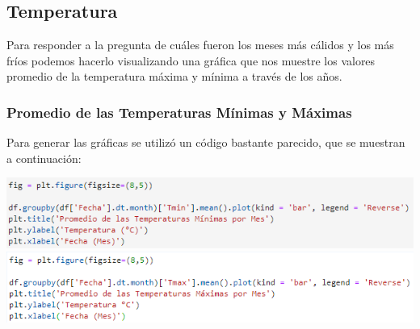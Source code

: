 \documentclass{article}
\begin{document}
\subsection{Temperatura}
Para responder a la pregunta de cuáles fueron los meses más cálidos y los más fríos podemos hacerlo visualizando una gráfica que nos muestre los valores promedio de la temperatura máxima y mínima a través de los años.

\subsubsection{Promedio de las Temperaturas Mínimas y Máximas}
Para generar las gráficas se utilizó un código bastante parecido, que se muestran a continuación:
\begin{center}
    \includegraphics[scale = 0.6]{Tmin.png}
    \includegraphics[scale = 0.6]{Tmax.png}
\end{center}

\clearpage
\end{document}
